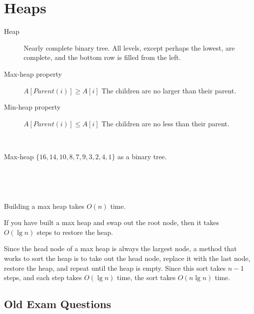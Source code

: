 \section{Heaps}

\begin{description}
	\item [Heap] Nearly complete binary tree.  All levels, except perhaps the lowest, are complete, and the bottom row is filled from the left.  
	\item [Max-heap property] $A[Parent(i)] \ge A[i]$ The children are no larger than their parent.  
	\item [Min-heap property] $A[Parent(i)] \le A[i]$ The children are no less than their parent.  
\end{description}

\

Max-heap $\{16,14,10,8,7,9,3,2,4,1\}$ as a binary tree.  

\


\

Building a max heap takes $O(n)$ time.  

If you have built a max heap and swap out the root node, then it takes $O(\lg n)$ steps to restore the heap.  

Since the head node of a max heap is always the largest node, a method that works to sort the heap is to take out the head node, replace it with the last node, restore the heap, and repeat until the heap is empty.  Since this sort takes $n-1$ steps, and each step takes $O(\lg n)$ time, the sort takes $O(n \lg n)$ time.  

\subsection{Old Exam Questions}

